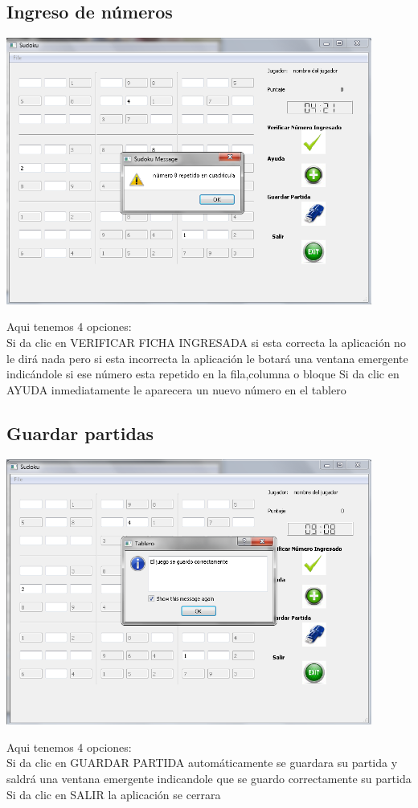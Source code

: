 \documentclass[12pt]{extbook}
\begin{document}
\begin{center}
\section{Ingreso de números}
\end{center}
\begin{center}
\includegraphics[width=12cm]{num_incorrecto1.png}
\end{center}
Aqui tenemos 4 opciones:\\
 Si da clic en VERIFICAR FICHA INGRESADA si esta correcta la aplicación no le dirá nada pero si esta incorrecta la aplicación le
botará una ventana emergente indicándole si ese número esta repetido en la fila,columna o bloque
Si da clic en AYUDA inmediatamente le aparecera un nuevo número en el tablero

\begin{center}
\section{Guardar partidas}
\end{center}
\begin{center}
\includegraphics[width=12cm]{partida_guardada1.png}
\end{center}
Aqui tenemos 4 opciones:\\
Si da clic en GUARDAR PARTIDA automáticamente se guardara su partida y saldrá una ventana emergente indicandole que se guardo correctamente su partida\\
Si da clic en SALIR la aplicación se cerrara \\
\end{document}
